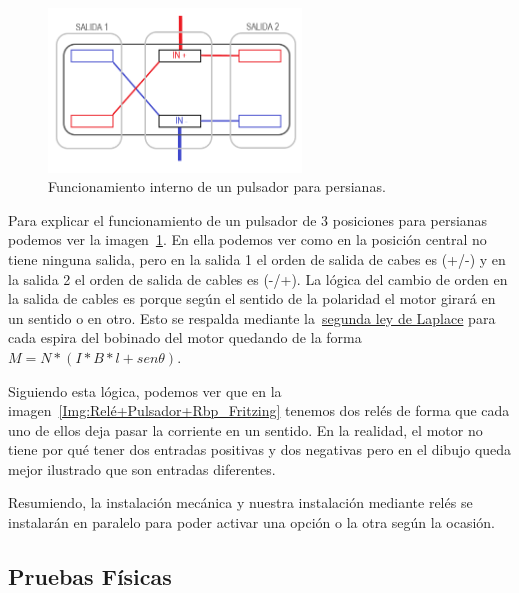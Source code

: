 \begin{figure}
    \centering
    \includegraphics[width=0.6\textwidth]{img/Diagramas/PulsadorInterno.png}
    \caption{Funcionamiento interno de un pulsador para persianas.} \label{img:PulsadorInterno}
\end{figure}

Para explicar el funcionamiento de un pulsador de 3 posiciones para persianas podemos ver la imagen~\ref{img:PulsadorInterno}. En ella podemos ver como en la posición central no tiene ninguna salida, pero en la salida 1 el orden de salida de cabes es (+/-) y en la salida 2 el orden de salida de cables es (-/+). La lógica del cambio de orden en la salida de cables es porque según el sentido de la polaridad el motor girará en un sentido o en otro. Esto se respalda mediante la~\href{https://fisica.laguia2000.com/dinamica-clasica/fuerzas/ley-de-laplace-fuerza-ejercida-sobre-un-conductor}{segunda ley de Laplace} para cada espira del bobinado del motor quedando de la forma~\href{http://www.uco.es/grupos/giie/cirweb/teoria/tema_11/tema_11_01.pdf}{$M=N*(I*B*l+sen\theta)$}.

Siguiendo esta lógica, podemos ver que en la imagen~\ref{Img:Relé+Pulsador+Rbp_Fritzing} tenemos dos relés de forma que cada uno de ellos deja pasar la corriente en un sentido. En la realidad, el motor no tiene por qué tener dos entradas positivas y dos negativas pero en el dibujo queda mejor ilustrado que son entradas diferentes.

Resumiendo, la instalación mecánica y nuestra instalación mediante relés se instalarán en paralelo para poder activar una opción o la otra según la ocasión.

\subsection{Pruebas Físicas}

